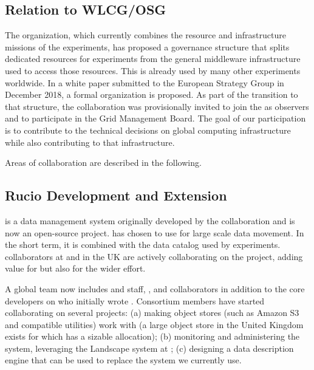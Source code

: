 \subsection{Relation to WLCG/OSG}
The  \cite{Bird:2014ctt} organization, which currently combines the resource and infrastructure missions of the  experiments, has proposed a governance structure that splits dedicated resources for  experiments from the general middleware infrastructure used to access those resources.  This  is already used by many other experiments worldwide.  In a white paper submitted to the European Strategy Group in December 2018\cite{bib:BirdEUStrategy}, a formal  organization is proposed. As part of the transition to that structure, the  collaboration was provisionally invited to join the  as observers and to participate in the Grid Management Board. The goal of our participation is to contribute to the technical decisions on global computing infrastructure while also contributing to that infrastructure. 

Areas of collaboration are described in the following. 

\subsection{Rucio Development and Extension}

 \cite{Barisits:2019fyl}
is a data management system originally developed by the  collaboration and is now an open-source project.   has chosen to use  for large scale data movement.  In the short term, it is combined with the  data catalog used by  experiments.   collaborators at  and in the UK are actively collaborating on the  project, adding value for  but also for the wider effort.


A global  team now includes  and  staff, , and  collaborators  in addition to the core developers on  who initially wrote .  Consortium members have started collaborating on several projects:  (a) making object stores (such as Amazon S3 and compatible utilities) work with  (a large object store in the United Kingdom exists for which  has a sizable allocation);  (b) monitoring  and administering the  system, leveraging the Landscape system at ;  (c) designing a  data description engine that can be used to replace the  system we currently use.




